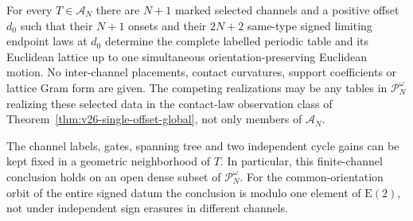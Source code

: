 \begin{theorem}
\label{thm:v45-generic-determination}
For every $T\in\mathscr A_N$ there are $N+1$ marked selected channels and
a positive offset $d_0$ such that their $N+1$ onsets and their $2N+2$
same-type signed limiting endpoint laws at $d_0$ determine the complete
labelled periodic table and its Euclidean lattice up to one simultaneous
orientation-preserving Euclidean motion.  No inter-channel placements,
contact curvatures, support coefficients or lattice Gram form are given.
The competing realizations may be any tables in $\mathscr P_N^\omega$
realizing these selected data in the contact-law observation class of
Theorem~\ref{thm:v26-single-offset-global}, not only members of $\mathscr A_N$.

The channel labels, gates, spanning tree and two independent cycle gains
can be kept fixed in a geometric neighborhood of $T$.  In particular,
this finite-channel conclusion holds on an open dense subset of
$\mathscr P_N^\omega$.  For the common-orientation orbit of the entire
signed datum the conclusion is modulo one element of $\mathrm E(2)$,
not under independent sign erasures in different channels.
\end{theorem}

